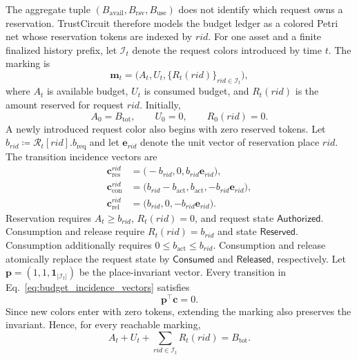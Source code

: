 \documentclass[10pt,journal,compsoc]{IEEEtran}
\begin{document}
The aggregate tuple $(B_{\mathrm{avail}},B_{\mathrm{rsv}},B_{\mathrm{use}})$ does not identify which request owns a reservation. TrustCircuit therefore models the budget ledger as a colored Petri net whose reservation tokens are indexed by $rid$. For one asset and a finite finalized history prefix, let $\mathcal{I}_t$ denote the request colors introduced by time $t$. The marking is
\begin{equation}
\mathbf{m}_t
=
\bigl(
A_t,U_t,\{R_t(rid)\}_{rid\in\mathcal{I}_t}
\bigr),
\label{eq:colored_budget_marking}
\end{equation}
where $A_t$ is available budget, $U_t$ is consumed budget, and
$R_t(rid)$ is the amount reserved for request $rid$. Initially,
\[
A_0=B_{\mathrm{tot}},
\qquad
U_0=0,
\qquad
R_0(rid)=0.
\]
A newly introduced request color also begins with zero reserved tokens. Let \( b_{rid}\coloneqq\mathcal{R}_t[rid].b_{\mathrm{req}} \) and let $\mathbf{e}_{rid}$ denote the unit vector of reservation place
$rid$. The transition incidence vectors are
\begin{equation}
\begin{aligned}
\mathbf{c}_{\mathrm{res}}^{rid}
&=
\bigl(
-b_{rid},0,b_{rid}\mathbf{e}_{rid}
\bigr),\\
\mathbf{c}_{\mathrm{con}}^{rid}
&=
\bigl(
b_{rid}-b_{\mathrm{act}},
b_{\mathrm{act}},
-b_{rid}\mathbf{e}_{rid}
\bigr),\\
\mathbf{c}_{\mathrm{rel}}^{rid}
&=
\bigl(
b_{rid},0,-b_{rid}\mathbf{e}_{rid}
\bigr).
\end{aligned}
\label{eq:budget_incidence_vectors}
\end{equation}
Reservation requires $A_t\geq b_{rid}$, $R_t(rid)=0$, and request state $\mathsf{Authorized}$. Consumption and release require $R_t(rid)=b_{rid}$ and state $\mathsf{Reserved}$. Consumption additionally requires $0\leq b_{\mathrm{act}}\leq b_{rid}$. Consumption and release atomically replace the request state by $\mathsf{Consumed}$ and $\mathsf{Released}$, respectively. Let \( \mathbf{p}= (1,1,\mathbf{1}_{|\mathcal{I}_t|}) \) be the place-invariant vector. Every transition in Eq.~\eqref{eq:budget_incidence_vectors} satisfies
\begin{equation}
\mathbf{p}^{\top}\mathbf{c}=0.
\label{eq:budget_p_invariant}
\end{equation}
Since new colors enter with zero tokens, extending the marking also preserves the invariant. Hence, for every reachable marking,
\begin{equation}
A_t+U_t+
\sum_{rid\in\mathcal{I}_t}
R_t(rid)
=
B_{\mathrm{tot}}.
\label{eq:budget_conservation_invariant}
\end{equation}
\end{document}
